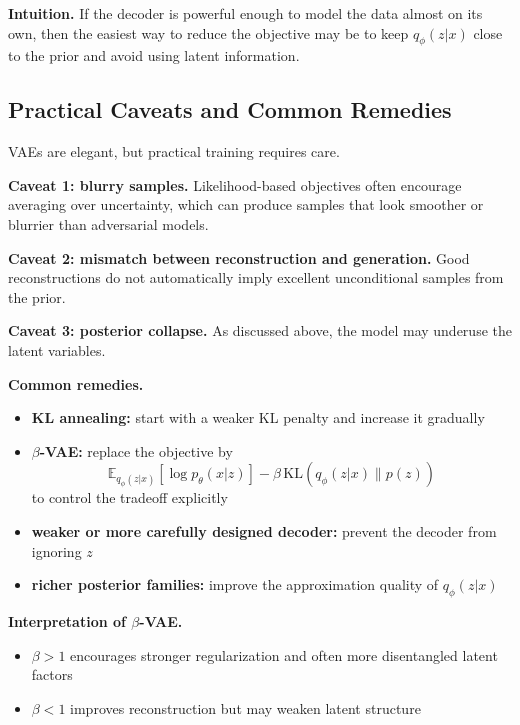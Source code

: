 \medskip

\noindent
\textbf{Intuition.}  
If the decoder is powerful enough to model the data almost on its own, then the easiest way to reduce the objective may be to keep $q_\phi(z|x)$ close to the prior and avoid using latent information.

\subsection{Practical Caveats and Common Remedies}

VAEs are elegant, but practical training requires care.

\medskip

\noindent
\textbf{Caveat 1: blurry samples.}  
Likelihood-based objectives often encourage averaging over uncertainty, which can produce samples that look smoother or blurrier than adversarial models.

\medskip

\noindent
\textbf{Caveat 2: mismatch between reconstruction and generation.}  
Good reconstructions do not automatically imply excellent unconditional samples from the prior.

\medskip

\noindent
\textbf{Caveat 3: posterior collapse.}  
As discussed above, the model may underuse the latent variables.

\medskip

\noindent
\textbf{Common remedies.}

\begin{itemize}
    \item \textbf{KL annealing:} start with a weaker KL penalty and increase it gradually
    \item \textbf{$\beta$-VAE:} replace the objective by
    \[
    \mathbb{E}_{q_\phi(z|x)}[\log p_\theta(x|z)]
    -
    \beta\,\mathrm{KL}(q_\phi(z|x)\|p(z))
    \]
    to control the tradeoff explicitly
    \item \textbf{weaker or more carefully designed decoder:} prevent the decoder from ignoring $z$
    \item \textbf{richer posterior families:} improve the approximation quality of $q_\phi(z|x)$
\end{itemize}

\medskip

\noindent
\textbf{Interpretation of $\beta$-VAE.}

\begin{itemize}
    \item $\beta > 1$ encourages stronger regularization and often more disentangled latent factors
    \item $\beta < 1$ improves reconstruction but may weaken latent structure
\end{itemize}

